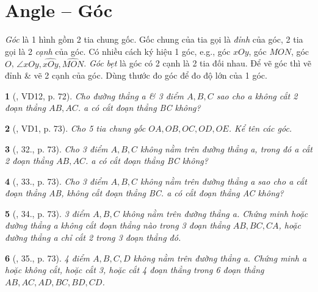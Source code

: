 \documentclass{article}
\newtheorem{baitoan}{}
\begin{document}

\section{Angle -- Góc}
 \textit{Góc} là 1 hình gồm 2 tia chung gốc. Gốc chung của tia gọi là \textit{đỉnh} của góc, 2 tia gọi là 2 \textit{cạnh} của góc. Có nhiều cách ký hiệu 1 góc, e.g., góc $xOy$, góc $MON$, góc $O$, $\angle xOy,\widehat{xOy},\widehat{MON}$.  \textit{Góc bẹt} là góc có 2 cạnh là 2 tia đối nhau.  Để vẽ góc thì vẽ đỉnh \& vẽ 2 cạnh của góc. Dùng thước đo góc để đo độ lớn của 1 góc.

\begin{baitoan}[\cite{Binh_Toan_6_tap_2}, VD12, p. 72]
	Cho đường thẳng a \& 3 điểm $A,B,C$ sao cho a không cắt 2 đoạn thẳng $AB,AC$. a có cắt đoạn thẳng BC không?
\end{baitoan}

\begin{baitoan}[\cite{Binh_Toan_6_tap_2}, VD1, p. 73]
	Cho 5 tia chung gốc $OA,OB,OC,OD,OE$. Kể tên các góc.
\end{baitoan}

\begin{baitoan}[\cite{Binh_Toan_6_tap_2}, 32., p. 73]
	Cho 3 điểm $A,B,C$ không nằm trên đường thẳng a, trong đó a cắt 2 đoạn thẳng $AB,AC$. a có cắt đoạn thẳng BC không?
\end{baitoan}

\begin{baitoan}[\cite{Binh_Toan_6_tap_2}, 33., p. 73]
	Cho 3 điểm $A,B,C$ không nằm trên đường thẳng a sao cho a cắt đoạn thẳng AB, không cắt đoạn thẳng BC. a có cắt đoạn thẳng AC không?
\end{baitoan}

\begin{baitoan}[\cite{Binh_Toan_6_tap_2}, 34., p. 73]
	3 điểm $A,B,C$ không nằm trên đường thẳng a. Chứng minh hoặc đường thẳng a không cắt đoạn thẳng nào trong 3 đoạn thẳng $AB,BC,CA$, hoặc đường thẳng a chỉ cắt 2 trong 3 đoạn thẳng đó.
\end{baitoan}

\begin{baitoan}[\cite{Binh_Toan_6_tap_2}, 35., p. 73]
	4 điểm $A,B,C,D$ không nằm trên đường thẳng a. Chứng minh a hoặc không cắt, hoặc cắt 3, hoặc cắt 4 đoạn thẳng trong 6 đoạn thẳng $AB,AC,AD,BC,BD,CD$.
\end{baitoan}
\end{document}
